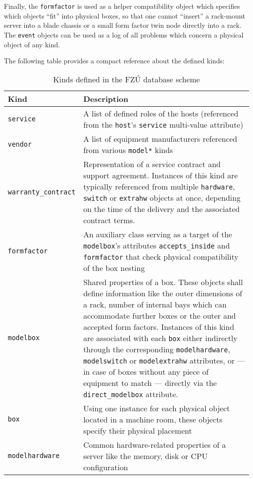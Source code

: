 \documentclass[deska]{subfiles}
\begin{document}
Finally, the {\tt formfactor} is used as a helper compatibility object which specifies which objects ``fit'' into
physical boxes, so that one cannot ``insert'' a rack-mount server into a blade chassis or a small form factor twin node
directly into a rack.  The {\tt event} objects can be used as a log of all problems which concern a physical object of
any kind.

The following table provides a compact reference about the defined kinds:

\begin{longtable}{ l | p{10cm}}
    \caption{Kinds defined in the FZÚ database scheme} \\
    Kind & Description \\
    \hline
    \endhead
    \label{tbl:fzu-kinds}
    {\tt service} & A list of defined roles of the hosts (referenced from the {\tt host}'s {\tt service} multi-value
    attribute) \\
    {\tt vendor} & A list of equipment manufacturers referenced from various {\tt model*} kinds \\
    {\tt warranty\_contract} & Representation of a service contract and support agreement.  Instances of this kind are
    typically referenced from multiple {\tt hardware}, {\tt switch} or {\tt extrahw} objects at once, depending on the
    time of the delivery and the associated contract terms. \\
    {\tt formfactor} & An auxiliary class serving as a target of the {\tt modelbox}'s attributes {\tt accepts\_inside}
    and {\tt formfactor} that check physical compatibility of the box nesting \\
    {\tt modelbox} & Shared properties of a box.  These objects shall define information like the outer dimensions of a
    rack, number of internal bays which can accommodate further boxes or the outer and accepted form factors.  Instances
    of this kind are associated with each {\tt box} either indirectly through the corresponding {\tt modelhardware},
    {\tt modelswitch} or {\tt modelextrahw} attributes, or --- in case of boxes without any piece of equipment to match
    --- directly via the {\tt direct\_modelbox} attribute. \\
    {\tt box} & Using one instance for each physical object located in a machine room, these objects specify their
    physical placement \\
    {\tt modelhardware} & Common hardware-related properties of a server like the memory, disk or CPU configuration \\

\end{longtable}
\end{document}
